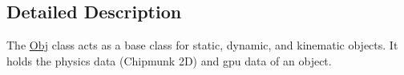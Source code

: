 \subsection{Detailed Description}
The \hyperlink{class_obj}{Obj} class acts as a base class for static, dynamic, and kinematic objects. It holds the physics data (Chipmunk 2D) and gpu data of an object. 